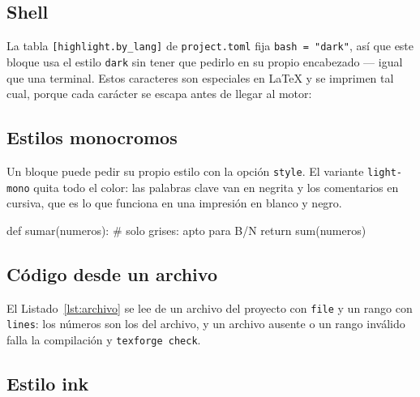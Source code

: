 \subsection{Shell}

La tabla \texttt{[highlight.by\_lang]} de \texttt{project.toml} fija
\texttt{bash = "dark"}, así que este bloque usa el estilo \texttt{dark} sin
tener que pedirlo en su propio encabezado --- igual que una terminal. Estos
caracteres son especiales en LaTeX y se imprimen tal cual, porque cada
carácter se escapa antes de llegar al motor:


\subsection{Estilos monocromos}

Un bloque puede pedir su propio estilo con la opción \texttt{style}. El
variante \texttt{light-mono} quita todo el color: las palabras clave van en
negrita y los comentarios en cursiva, que es lo que funciona en una
impresión en blanco y negro.

\begin{code}[lang=python, style=light-mono]
def sumar(numeros):  # solo grises: apto para B/N
    return sum(numeros)
\end{code}

\subsection{Código desde un archivo}

El Listado~\ref{lst:archivo} se lee de un archivo del proyecto con
\texttt{file} y un rango con \texttt{lines}: los números son los del
archivo, y un archivo ausente o un rango inválido falla la compilación
y \texttt{texforge check}.

\begin{code}[lang=python, file=scripts/stats.py, lines=5-20, numbers=true, caption={Funciones leídas del archivo}, label={lst:archivo}]
\end{code}

\subsection{Estilo ink}

